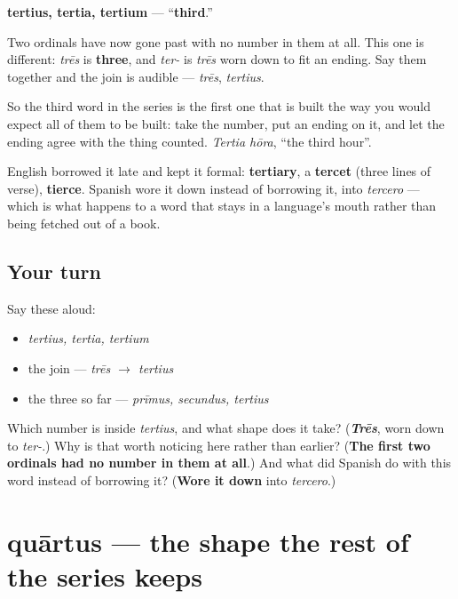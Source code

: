 \begin{cousinweb}
\textbf{tertius, tertia, tertium} — \textquotedblleft{}\textbf{third}.\textquotedblright{}

Two ordinals have now gone past with no number in them at all. This one is different: \emph{trēs} is \textbf{three}, and \emph{ter-} is \emph{trēs} worn down to fit an ending. Say them together and the join is audible — \emph{trēs}, \emph{tertius}.

So the third word in the series is the first one that is built the way you would expect all of them to be built: take the number, put an ending on it, and let the ending agree with the thing counted. \emph{Tertia hōra}, \textquotedblleft{}the third hour\textquotedblright{}.

English borrowed it late and kept it formal: \textbf{tertiary}, a \textbf{tercet} (three lines of verse), \textbf{tierce}. Spanish wore it down instead of borrowing it, into \emph{tercero} — which is what happens to a word that stays in a language's mouth rather than being fetched out of a book.
\end{cousinweb}

\subsection*{Your turn}
Say these aloud:

\begin{itemize}
\raggedright
  \item \emph{tertius, tertia, tertium}
  \item the join — \emph{trēs $\to$ tertius}
  \item the three so far — \emph{prīmus, secundus, tertius}
\end{itemize}

\begin{tcolorbox}[breakable,colback=teal!4,colframe=teal!35!black,title={Before you move on}]
Which number is inside \emph{tertius}, and what shape does it take? (\emph{\textbf{Trēs}}, worn down to \emph{ter-}.) Why is that worth noticing here rather than earlier? (\textbf{The first two ordinals had no number in them at all}.) And what did Spanish do with this word instead of borrowing it? (\textbf{Wore it down} into \emph{tercero}.)
\end{tcolorbox}
\section[quārtus, quārta, quārtum]{quārtus — the shape the rest of the series keeps}

